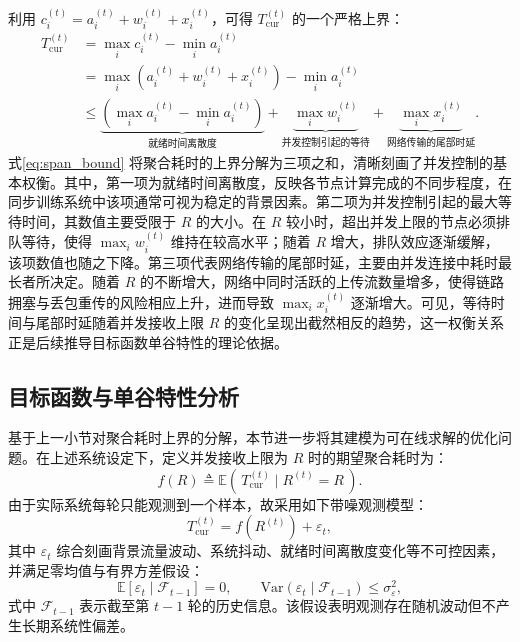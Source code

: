\documentclass[master, vlined]{DissertUESTC}
\begin{document}
	利用 $c_i^{(t)} = a_i^{(t)} + w_i^{(t)} + x_i^{(t)}$，可得 $T_{\mathrm{cur}}^{(t)}$ 的一个严格上界：
	\begin{align}
		T_{\mathrm{cur}}^{(t)}
		&= \max_i c_i^{(t)} - \min_i a_i^{(t)} \nonumber\\
		&= \max_i\!\left(a_i^{(t)} + w_i^{(t)} + x_i^{(t)}\right) - \min_i a_i^{(t)} \nonumber\\
		&\le \underbrace{\left(\max_i a_i^{(t)} - \min_i a_i^{(t)}\right)}_{\text{就绪时间离散度}}
		+ \underbrace{\max_i w_i^{(t)}}_{\text{并发控制引起的等待}}
		+ \underbrace{\max_i x_i^{(t)}}_{\text{网络传输的尾部时延}}.
	\label{eq:span_bound}
	\end{align}
	式\eqref{eq:span_bound} 将聚合耗时的上界分解为三项之和，清晰刻画了并发控制的基本权衡。其中，第一项为就绪时间离散度，反映各节点计算完成的不同步程度，在同步训练系统中该项通常可视为稳定的背景因素。第二项为并发控制引起的最大等待时间，其数值主要受限于 $R$ 的大小。在 $R$ 较小时，超出并发上限的节点必须排队等待，使得 $\max_i w_i^{(t)}$ 维持在较高水平；随着 $R$ 增大，排队效应逐渐缓解，该项数值也随之下降。第三项代表网络传输的尾部时延，主要由并发连接中耗时最长者所决定。随着 $R$ 的不断增大，网络中同时活跃的上传流数量增多，使得链路拥塞与丢包重传的风险相应上升，进而导致 $\max_i x_i^{(t)}$ 逐渐增大。可见，等待时间与尾部时延随着并发接收上限 $R$ 的变化呈现出截然相反的趋势，这一权衡关系正是后续推导目标函数单谷特性的理论依据。

	\subsection{目标函数与单谷特性分析}
	\label{subsec:obj_model}

	基于上一小节对聚合耗时上界的分解，本节进一步将其建模为可在线求解的优化问题。在上述系统设定下，定义并发接收上限为 $R$ 时的期望聚合耗时为：
	\begin{equation}
		f(R) \triangleq \mathbb{E}\!\left(\,T_{\mathrm{cur}}^{(t)} \mid R^{(t)}=R\,\right).
	\label{eq:f_def}
	\end{equation}
	由于实际系统每轮只能观测到一个样本，故采用如下带噪观测模型：
	\begin{equation}
		T_{\mathrm{cur}}^{(t)} = f\!\left(R^{(t)}\right) + \varepsilon_t,
	\label{eq:obs}
	\end{equation}
	其中 $\varepsilon_t$ 综合刻画背景流量波动、系统抖动、就绪时间离散度变化等不可控因素，并满足零均值与有界方差假设：
	\begin{equation}
		\mathbb{E}[\varepsilon_t \mid \mathcal{F}_{t-1}] = 0,\qquad
		\mathrm{Var}(\varepsilon_t \mid \mathcal{F}_{t-1}) \le \sigma_\varepsilon^2,
	\label{eq:noise_assumption}
	\end{equation}
	式中 $\mathcal{F}_{t-1}$ 表示截至第 $t-1$ 轮的历史信息。该假设表明观测存在随机波动但不产生长期系统性偏差。
\end{document}
